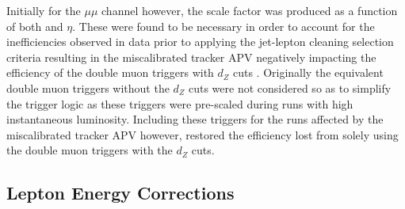 Initially for the $\mu\mu$ channel however, the scale factor was produced as a function of both \pt and $\eta$.
These were found to be necessary in order to account for the inefficiencies observed in data prior to applying the jet-lepton cleaning selection criteria resulting in the miscalibrated tracker APV negatively impacting the efficiency of the double muon triggers with $d_{Z}$ cuts .
Originally the equivalent double muon triggers without the $d_{Z}$ cuts were not considered so as to simplify the trigger logic as these triggers were pre-scaled during runs with high instantaneous luminosity.
Including these triggers for the runs affected by the miscalibrated tracker APV however, restored the efficiency lost from solely using the double muon triggers with the $d_{Z}$ cuts.

\begin{table}[htbp]
\label{tab:triggerSFs}
  \centering
\end{table}



\subsection{Lepton Energy Corrections}\label{subsec:leptonEnergyCorrections}
